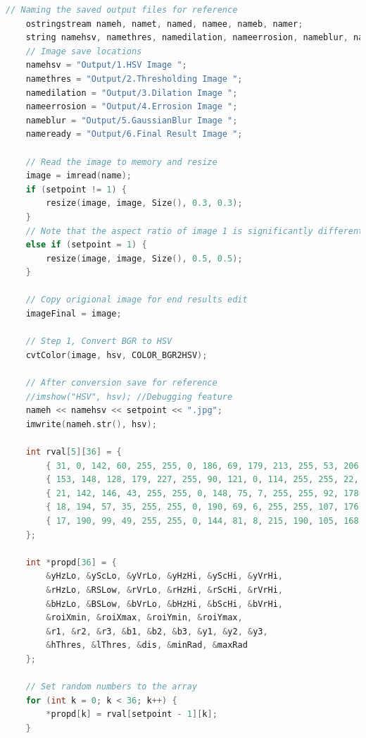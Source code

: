 \documentclass[a4paper, 10pt]{article}
\begin{document}
\begin{lstlisting}[language = C++]
	// Naming the saved output files for reference
	ostringstream nameh, namet, named, namee, nameb, namer;
	string namehsv, namethres, namedilation, nameerrosion, nameblur, nameready;
	// Image save locations
	namehsv = "Output/1.HSV Image ";
	namethres = "Output/2.Thresholding Image ";
	namedilation = "Output/3.Dilation Image ";
	nameerrosion = "Output/4.Errosion Image ";
	nameblur = "Output/5.GaussianBlur Image ";
	nameready = "Output/6.Final Result Image ";

	// Read the image to memory and resize
	image = imread(name);
	if (setpoint != 1) {
		resize(image, image, Size(), 0.3, 0.3);
	}
	// Note that the aspect ratio of image 1 is significantly different than the others, these values provide better results
	else if (setpoint = 1) {
		resize(image, image, Size(), 0.5, 0.5);
	}

	// Copy origional image for end results edit
	imageFinal = image;

	// Step 1, Convert BGR to HSV
	cvtColor(image, hsv, COLOR_BGR2HSV);

	// After conversion save for reference
	//imshow("HSV", hsv); //Debugging feature
	nameh << namehsv << setpoint << ".jpg";
	imwrite(nameh.str(), hsv);

	int rval[5][36] = {
		{ 31, 0, 142, 60, 255, 255, 0, 186, 69, 179, 213, 255, 53, 206, 51, 179, 255, 255, 300, 700, 50, 470, 100, 100, 100, 90, 50, 30, 100, 100, 100, 150, 50, 30, 10, 40 },
		{ 153, 148, 128, 179, 227, 255, 90, 121, 0, 114, 255, 255, 22, 63, 148, 89, 198, 255, 260, 700, 170, 470, 110, 100, 100, 100, 130, 50, 140, 180, 110, 150, 50, 30, 10, 40 },
		{ 21, 142, 146, 43, 255, 255, 0, 148, 75, 7, 255, 255, 92, 178, 8, 150, 255, 225, 260, 700, 50, 470, 50, 40, 70, 20, 30,20, 10, 160, 160, 126, 42, 30, 5, 40 },
		{ 18, 194, 57, 35, 255, 255, 0, 190, 69, 6, 255, 255, 107, 176, 45, 112, 255, 255, 260, 700, 50, 470, 60, 65, 67, 34, 85, 88, 100, 100, 100, 82, 34, 30, 10, 40 },
		{ 17, 190, 99, 49, 255, 255, 0, 144, 81, 8, 215, 190, 105, 168, 24, 157, 255, 204, 260, 600, 170, 470, 100, 100, 100, 66, 70, 61, 100, 100, 100, 100, 33, 30, 10, 40 }
	};

	int *propd[36] = {
		&yHzLo, &yScLo, &yVrLo, &yHzHi, &yScHi, &yVrHi,
		&rHzLo, &RSLow, &rVrLo, &rHzHi, &rScHi, &rVrHi,
		&bHzLo, &BSLow, &bVrLo, &bHzHi, &bScHi, &bVrHi,
		&roiXmin, &roiXmax, &roiYmin, &roiYmax,
		&r1, &r2, &r3, &b1, &b2, &b3, &y1, &y2, &y3,
		&hThres, &lThres, &dis, &minRad, &maxRad
	};

	// Set random numbers to the array
	for (int k = 0; k < 36; k++) {
		*propd[k] = rval[setpoint - 1][k];
	}


\end{lstlisting}
\end{document}
